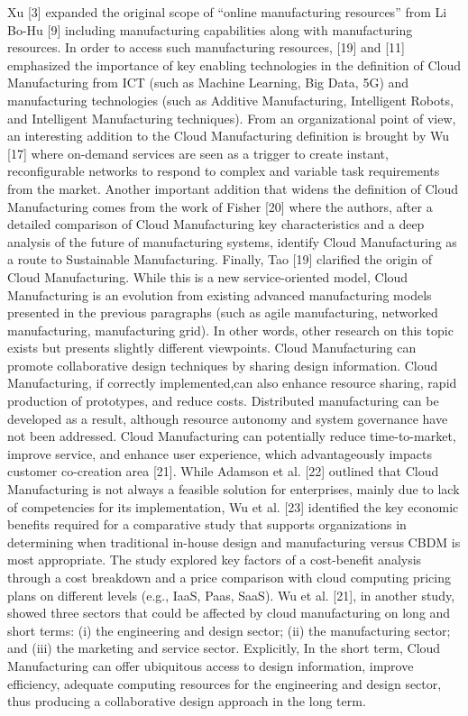 Xu [3] expanded the original scope of “online manufacturing resources” from Li Bo-Hu [9] including manufacturing capabilities along with manufacturing resources. In order to access such manufacturing resources, [19] and [11] emphasized the importance of key enabling technologies in the definition of Cloud Manufacturing from ICT (such as Machine Learning, Big Data, 5G) and manufacturing technologies (such as Additive Manufacturing, Intelligent Robots, and Intelligent Manufacturing techniques). From an organizational point of view, an interesting addition to the Cloud Manufacturing definition is brought by Wu [17] where on-demand services are seen as a trigger to create instant, reconfigurable networks to respond to complex and variable task requirements from the market. Another important addition that widens the definition of Cloud Manufacturing comes from the work of Fisher [20] where the authors, after a detailed comparison of Cloud Manufacturing key characteristics and a deep analysis of the future of manufacturing systems, identify Cloud Manufacturing as a route to Sustainable Manufacturing. Finally, Tao [19] clarified the origin of Cloud Manufacturing. While this is a new service-oriented model, Cloud Manufacturing is an evolution from existing advanced manufacturing models presented in the previous paragraphs (such as agile manufacturing, networked manufacturing, manufacturing grid). In other words, other research on this topic exists but presents slightly different viewpoints. Cloud Manufacturing can promote collaborative design techniques by sharing design information. Cloud Manufacturing, if correctly implemented,can also enhance resource sharing, rapid production of prototypes, and reduce costs. Distributed manufacturing can be developed as a result, although resource autonomy and system governance have not been addressed. Cloud Manufacturing can potentially reduce time-to-market, improve service, and enhance user experience, which advantageously impacts customer co-creation area [21]. While Adamson et al. [22] outlined that Cloud Manufacturing is not always a feasible solution for enterprises, mainly due to lack of competencies for its implementation, Wu et al. [23] identified the key economic benefits required for a comparative study that supports organizations in determining when traditional in-house design and manufacturing versus CBDM is most appropriate. The study explored key factors of a cost-benefit analysis through a cost breakdown and a price comparison with cloud computing pricing plans on different levels (e.g., IaaS, Paas, SaaS). Wu et al. [21], in another study, showed three sectors that could be affected by cloud manufacturing on long and short terms: (i) the engineering and design sector; (ii) the manufacturing sector; and (iii) the marketing and service sector. Explicitly, In the short term, Cloud Manufacturing can offer ubiquitous access to design information, improve efficiency, adequate computing resources for the engineering and design sector, thus producing a collaborative design approach in the long term.\\
